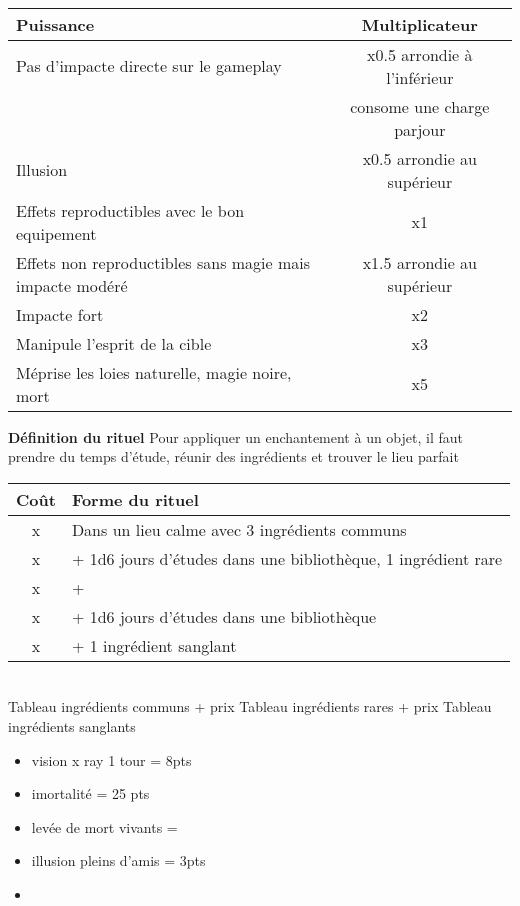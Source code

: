 \documentclass[11pt]{article} %
\newcommand{\myjump}[1][1]{\mbox{}\\[#1cm]}
\begin{document}
\myjump[0.35]\noindent
\begin{tabularx}{\linewidth}{|Xc|}
\hline

    \textbf{Puissance} & \textbf{Multiplicateur}\\
    \hline
    Pas d'impacte directe sur le gameplay & x0.5 arrondie à l'inférieur\\
    & consome une charge parjour\\
    Illusion & x0.5 arrondie au supérieur\\
    Effets reproductibles avec le bon equipement & x1\\
    Effets non reproductibles sans magie mais impacte modéré & x1.5 arrondie au supérieur\\
    Impacte fort & x2\\
    Manipule l'esprit de la cible & x3\\
    Méprise les loies naturelle, magie noire, mort & x5\\


\hline
\end{tabularx}


\newpage
\textbf{\huge Définition du rituel}\newline
Pour appliquer un enchantement à un objet, il faut prendre du temps d'étude, réunir des ingrédients et trouver le lieu parfait

\begin{tabularx}{\linewidth}{|cX|}
\hline

    \textbf{Coût} & \textbf{Forme du rituel}\\
    \hline
    x & Dans un lieu calme avec 3 ingrédients communs\\
    x & + 1d6 jours d'études dans une bibliothèque, 1 ingrédient rare\\
    x & + \\
    x & + 1d6 jours d'études dans une bibliothèque\\
    x & + 1 ingrédient sanglant\\


\hline
\end{tabularx}


\myjump
Tableau ingrédients communs + prix\newline
Tableau ingrédients rares + prix  \newline
Tableau ingrédients sanglants\newline




\begin{itemize}
    \item vision x ray 1 tour = 8pts
    \item imortalité = 25 pts
    \item levée de mort vivants =
    \item illusion pleins d'amis = 3pts
    \item
\end{itemize}
\end{document}
